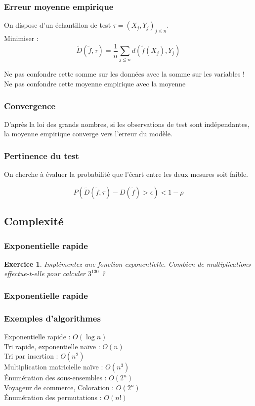 \documentclass[11pt]{beamer}
\newenvironment{slide}[1]{%
\begin{frame}[environment=slide]
\frametitle{#1}
}{%
\end{frame}
}
\newtheorem{exercice}{Exercice}
\newcommand{\Python}[1]{
	{\small	}
}
\begin{document}
\begin{slide}{Erreur moyenne empirique}

On dispose d'un échantillon de test $\tau = (X_j,Y_j)_{j\leq n}$.\\

Minimiser :
$$\tilde{D}(\tilde{f},\tau) = \frac{1}{n}\sum_{j \leq n} d(\tilde{f}(X_j),Y_j)$$

\pause

Ne pas confondre cette somme sur les données avec la somme sur les variables !\\
Ne pas confondre cette moyenne empirique avec la moyenne 
\end{slide}

\begin{slide}{Convergence}

D'après la loi des grands nombres, si les observations de test sont indépendantes, la moyenne empirique converge vers l'erreur du modèle.
\end{slide}

\begin{slide}{Pertinence du test}
On cherche à évaluer la probabilité que l'écart entre les deux mesures soit faible.

$$P\left(\tilde{D}(\tilde{f},\tau)-D(\tilde{f}) > \epsilon \right) < 1 - \rho$$

\end{slide}

\subsection{Complexité}

\begin{slide}{Exponentielle rapide}
\begin{exercice}
Implémentez une fonction exponentielle. Combien de multiplications effectue-t-elle pour calculer $3^{130}$ ?
\end{exercice}
\end{slide}

\begin{slide}{Exponentielle rapide}
\Python{fastexp}
\end{slide}


\begin{slide}{Exemples d'algorithmes}

Exponentielle rapide : $O(\log n)$\\
Tri rapide, exponentielle naïve : $O(n)$\\
Tri par insertion : $O(n^2)$\\
Multiplication matricielle naïve : $O(n^3)$\\
{\'E}numération des sous-ensembles : $O(2^n)$\\
Voyageur de commerce, Coloration : $O(2^n)$\\
{\'E}numération des permutations : $O(n!)$

\end{slide}
\end{document}
